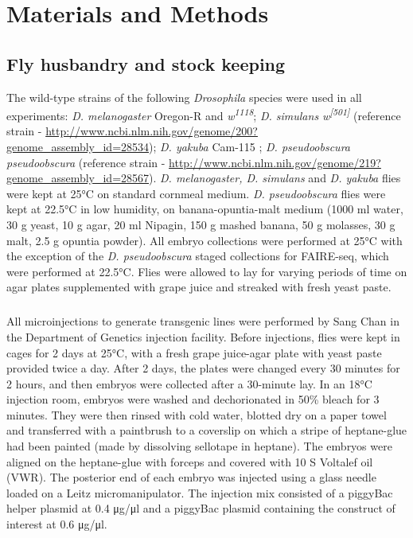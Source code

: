 \chapter{Materials and Methods}

\hrulefill

\section{Fly husbandry and stock keeping}
The wild-type strains of the following \emph{Drosophila} species were used in all experiments: \emph{D. melanogaster} Oregon-R and \emph{w\textsuperscript{1118}}; \emph{D. simulans w\textsuperscript{[501]}} (reference strain - \url{http://www.ncbi.nlm.nih.gov/genome/200?genome_assembly_id=28534}); \emph{D. yakuba} Cam-115 \citep{coyne_genetic_2004}; \emph{D. pseudoobscura pseudoobscura} (reference strain - \url{http://www.ncbi.nlm.nih.gov/genome/219?genome_assembly_id=28567}). \emph{D. melanogaster, D. simulans} and \emph{D. yakuba} flies were kept at 25°C on standard cornmeal medium. \emph{D. pseudoobscura} flies were kept at 22.5°C in low humidity, on banana-opuntia-malt medium (1000 ml water, 30 g yeast, 10 g agar, 20 ml Nipagin, 150 g mashed banana, 50 g molasses, 30 g malt, 2.5 g opuntia powder). All embryo collections were performed at 25°C with the exception of the \emph{D. pseudoobscura} staged collections for FAIRE-seq, which were performed at 22.5°C. Flies were allowed to lay for varying periods of time on agar plates supplemented with grape juice and streaked with fresh yeast paste.
\paragraph{}
All microinjections to generate transgenic lines were performed by Sang Chan in the Department of Genetics injection facility. Before injections, flies were kept in cages for 2 days at 25°C, with a fresh grape juice-agar plate with yeast paste provided twice a day. After 2 days, the plates were changed every 30 minutes for 2 hours, and then embryos were collected after a 30-minute lay. In an 18°C injection room, embryos were washed and dechorionated in 50\% bleach for 3 minutes. They were then rinsed with cold water, blotted dry on a paper towel and transferred with a paintbrush to a coverslip on which a stripe of heptane-glue had been painted (made by dissolving sellotape in heptane). The embryos were aligned on the heptane-glue with forceps and covered with 10 S Voltalef oil (VWR). The posterior end of each embryo was injected using a glass needle loaded on a Leitz micromanipulator. The injection mix consisted of a piggyBac helper plasmid at 0.4 μg/μl and a piggyBac plasmid containing the construct of interest at 0.6 μg/μl.
